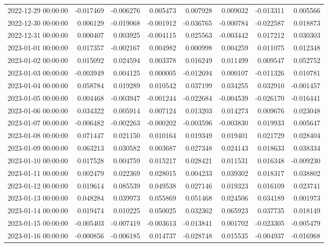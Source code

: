 \begin{tabular}{lrrrrrrr}
2022-12-29 00:00:00 & -0.017469 & -0.006276 & 0.005473 & 0.007928 & 0.009032 & -0.013311 & 0.005566 \\
2022-12-30 00:00:00 & 0.006129 & -0.019068 & -0.001912 & -0.036765 & -0.000784 & -0.022587 & 0.018873 \\
2022-12-31 00:00:00 & 0.000407 & 0.003925 & -0.004115 & 0.025563 & -0.003442 & 0.017212 & 0.030303 \\
2023-01-01 00:00:00 & 0.017357 & -0.002167 & 0.004982 & 0.000998 & 0.004259 & 0.011075 & 0.012348 \\
2023-01-02 00:00:00 & 0.015092 & 0.024594 & 0.003378 & 0.016249 & 0.011499 & 0.009547 & 0.052752 \\
2023-01-03 00:00:00 & -0.003949 & 0.004125 & 0.000005 & -0.012694 & 0.000107 & -0.011326 & 0.010781 \\
2023-01-04 00:00:00 & 0.058784 & 0.019289 & 0.010542 & 0.037199 & 0.034255 & 0.032910 & -0.001457 \\
2023-01-05 00:00:00 & 0.004468 & -0.003947 & -0.001244 & -0.022684 & -0.004539 & -0.026170 & -0.016441 \\
2023-01-06 00:00:00 & 0.034322 & 0.005914 & 0.007124 & 0.013203 & 0.014273 & 0.009676 & 0.023048 \\
2023-01-07 00:00:00 & -0.006482 & -0.002263 & -0.000202 & -0.003596 & -0.003830 & 0.019933 & 0.005647 \\
2023-01-08 00:00:00 & 0.071447 & 0.021150 & 0.010164 & 0.019349 & 0.019401 & 0.021729 & 0.028404 \\
2023-01-09 00:00:00 & 0.063213 & 0.030582 & 0.003687 & 0.027348 & 0.024143 & 0.018633 & 0.038334 \\
2023-01-10 00:00:00 & 0.017528 & 0.004759 & 0.015217 & 0.028421 & 0.011531 & 0.016348 & -0.009230 \\
2023-01-11 00:00:00 & 0.002479 & 0.022369 & 0.028015 & 0.004233 & 0.039302 & 0.018317 & 0.038802 \\
2023-01-12 00:00:00 & 0.019614 & 0.085539 & 0.049538 & 0.027146 & 0.019323 & 0.016109 & 0.023741 \\
2023-01-13 00:00:00 & 0.048284 & 0.039973 & 0.055869 & 0.051468 & 0.024506 & 0.034189 & 0.001973 \\
2023-01-14 00:00:00 & 0.019474 & 0.010225 & 0.050025 & 0.032362 & 0.065923 & 0.037735 & 0.018149 \\
2023-01-15 00:00:00 & -0.005403 & -0.007419 & -0.003613 & -0.013841 & 0.001702 & -0.023305 & -0.005479 \\
2023-01-16 00:00:00 & -0.000856 & -0.006185 & 0.014737 & -0.028748 & 0.015535 & -0.004937 & -0.016968 \\

\end{tabular}
